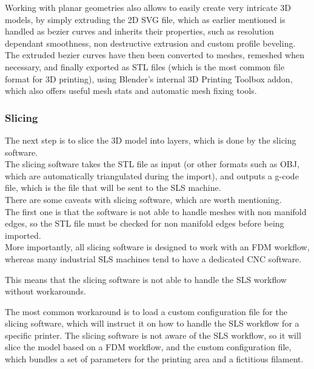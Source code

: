 \documentclass{article}
\begin{document}
        Working with planar geometries also allows to easily create very intricate 3D models, by simply extruding the 2D SVG file, 
        which as earlier mentioned is handled as bezier curves and inherits their properties, such as resolution 
        dependant smoothness, non destructive extrusion and custom profile beveling. \\

        The extruded bezier curves have then been converted to meshes, remeshed when necessary, and finally 
        exported as STL files (which is the most common file format for 3D printing), using 
        Blender's internal 3D Printing Toolbox addon, which also offers useful mesh stats and 
        automatic mesh fixing tools. \\
        
        \subsubsection{Slicing\label{Slicing}}
        
        The next step is to slice the 3D model into layers, which is done by the slicing software. \\

        The slicing software takes the STL file as input (or other formats such as OBJ, which are
        automatically triangulated during the import), and outputs a g-code file, which is the file that will be sent to the SLS machine. \\

        There are some caveats with slicing software, which are worth mentioning. \\

        The first one is that the software is not able to handle meshes with non manifold edges, so 
        the STL file must be checked for non manifold edges before being imported. \\ 

        More importantly, all slicing software is designed to work with an FDM workflow, whereas 
        many industrial SLS machines tend to have a dedicated CNC software. 

        This means that the slicing software is not able to handle the SLS workflow without workarounds. 

        The most common workaround is to load a custom configuration file for the slicing software, 
        which will instruct it on how to handle the SLS workflow for a specific printer. 
        The slicing software is not aware of the SLS workflow, so it will slice the model 
        based on a FDM workflow, and the custom configuration file, which bundles a set of 
        parameters for the printing area and a fictitious filament. \\ 
\end{document}

